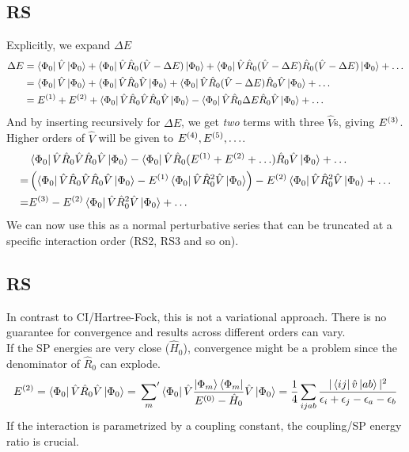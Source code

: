 \documentclass[
11pt,notheorems,hyperref={pdfauthor=whatever}
]{beamer}
\begin{document}
\subsection{RS}
\begin{frame}
    Explicitly, we expand $\Delta E$
    \begin{align*}
        \Delta E &= \bra{\Phi_0}\hat{V}\ket{\Phi_0} + \bra{\Phi_0}\hat{V}\hat{R}_0(\hat{V} - \Delta E)\ket{\Phi_0} + \bra{\Phi_0}\hat{V}\hat{R}_0(\hat{V} - \Delta E)\hat{R}_0(\hat{V}-\Delta E)\ket{\Phi_0} + \ldots \\
        &=  \bra{\Phi_0}\hat{V}\ket{\Phi_0} + \bra{\Phi_0}\hat{V}\hat{R}_0\hat{V}\ket{\Phi_0} + \bra{\Phi_0}\hat{V}\hat{R}_0(\hat{V} - \Delta E)\hat{R}_0\hat{V}\ket{\Phi_0} + \ldots \\
        &= E^{(1)} + E^{(2)} + \bra{\Phi_0}\hat{V}\hat{R}_0\hat{V}\hat{R}_0\hat{V}\ket{\Phi_0} - \bra{\Phi_0}\hat{V}\hat{R}_0\Delta E \hat{R}_0 \hat{V}\ket{\Phi_0} + \ldots
    \end{align*}
    And by inserting recursively for $\Delta E$, we get \textit{two} terms with three $\hat{V}$s, giving $E^{(3)}$. Higher orders of $\hat{V}$ will be given to $E^{(4)}, E^{(5)}, \ldots$.
    \begin{align*}
        &\bra{\Phi_0}\hat{V}\hat{R}_0\hat{V}\hat{R}_0\hat{V}\ket{\Phi_0} - \bra{\Phi_0}\hat{V}\hat{R}_0 (E^{(1)} + E^{(2)} + \ldots) \hat{R}_0 \hat{V}\ket{\Phi_0} + \ldots \\
        =&  \left( \bra{\Phi_0}\hat{V}\hat{R}_0\hat{V}\hat{R}_0\hat{V}\ket{\Phi_0} - E^{(1)}\bra{\Phi_0}\hat{V}\hat{R}_0^2 \hat{V}\ket{\Phi_0} \right) - E^{(2)}\bra{\Phi_0}\hat{V}\hat{R}_0^2 \hat{V}\ket{\Phi_0} + \ldots \\
        =& E^{(3)} - E^{(2)}\bra{\Phi_0}\hat{V}\hat{R}_0^2 \hat{V}\ket{\Phi_0} + \ldots
    \end{align*}
    We can now use this as a normal perturbative series that can be truncated at a specific interaction order (RS2, RS3 and so on). 
\end{frame}

\subsection{RS}
\begin{frame}
    In contrast to CI/Hartree-Fock, this is not a variational approach. There is no guarantee for convergence and results across different orders can vary.
    \\[10pt]
    If the SP energies are very close ($\hat{H}_0$), convergence might be a problem since the denominator of $\hat{R}_0$ can explode.
    \begin{align*}
        E^{(2)} = \bra{\Phi_0}\hat{V}\hat{R}_0 \hat{V}\ket{\Phi_0} = \sideset{}{'}\sum_m \bra{\Phi_0}\hat{V}\frac{\ket{\Phi_m}\bra{\Phi_m}}{E^{(0)}-\hat{H}_0}\hat{V}\ket{\Phi_0}= \frac{1}{4} \sum_{ijab} \frac{|\bra{ij}\hat{v}\ket{ab}|^2}{\epsilon_i + \epsilon_j - \epsilon_a - \epsilon_b}
    \end{align*}
    If the interaction is parametrized by a coupling constant, the coupling/SP energy ratio is crucial.
\end{frame}
\end{document}
